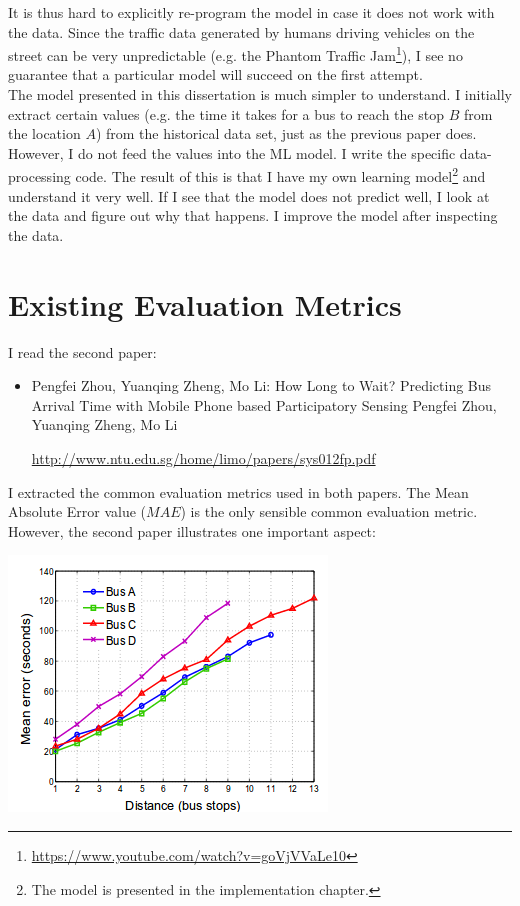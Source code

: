 \documentclass[12pt,a4paper,oneside,openright]{report}
\begin{document}
It is thus hard to explicitly re-program the model in case it does not work with the data.
Since the traffic data generated by humans driving vehicles on the street can be very
unpredictable (e.g. the Phantom Traffic
Jam\footnote{\textcolor{blue}{\url{https://www.youtube.com/watch?v=goVjVVaLe10}}}),
I see no guarantee that a particular model will succeed on the first attempt. \\

The model presented in this dissertation is much simpler to understand. I initially extract
certain values (e.g. the time it takes for a bus to reach the stop $B$ from the location $A$)
from the historical data set, just as the previous paper does. However, I do not feed the values
into the ML model. I write the specific data-processing code. The result of this is that
I have my own learning model\footnote{The model is presented in the
implementation chapter.} and understand it very well. If I see that the model does not predict
well, I look at the data and figure out why that happens. I improve the model after inspecting
the data. \\

\section{Existing Evaluation Metrics}

I read the second paper:

\begin{itemize}

\item Pengfei Zhou, Yuanqing Zheng, Mo Li: How Long to Wait? Predicting Bus Arrival Time
      with Mobile Phone based Participatory Sensing Pengfei Zhou, Yuanqing Zheng, Mo Li

\textcolor{blue}{\url{http://www.ntu.edu.sg/home/limo/papers/sys012fp.pdf}}

\end{itemize}

I extracted the common evaluation metrics used in both papers. The Mean Absolute Error value
($MAE$) is the only sensible common evaluation metric. \\

However, the second paper illustrates one important aspect:

\includegraphics[scale=0.8]{figs/second_paper.png}
\end{document}
